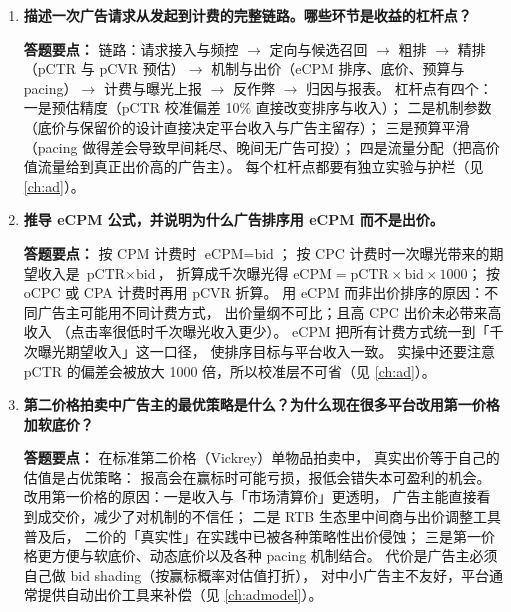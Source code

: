 \begin{interview}[题库与答题要点]

\begin{enumerate}[label=]

  \item[\textcolor{VioletDeep}{\textbf{Q59.}}] \textbf{描述一次广告请求从发起到计费的完整链路。哪些环节是收益的杠杆点？}
\par\smallskip\noindent\textcolor{VioletDeep}{\textbf{答题要点：}}
链路：请求接入与频控 $\to$ 定向与候选召回 $\to$ 粗排 $\to$
精排（pCTR 与 pCVR 预估）$\to$ 机制与出价（eCPM 排序、底价、预算与 pacing）$\to$
计费与曝光上报 $\to$ 反作弊 $\to$ 归因与报表。
杠杆点有四个：一是预估精度（pCTR 校准偏差 10\% 直接改变排序与收入）；
二是机制参数（底价与保留价的设计直接决定平台收入与广告主留存）；
三是预算平滑（pacing 做得差会导致早间耗尽、晚间无广告可投）；
四是流量分配（把高价值流量给到真正出价高的广告主）。
每个杠杆点都要有独立实验与护栏（见 \cref{ch:ad}）。

  \item[\textcolor{VioletDeep}{\textbf{Q60.}}] \textbf{推导 eCPM 公式，并说明为什么广告排序用 eCPM 而不是出价。}
\par\smallskip\noindent\textcolor{VioletDeep}{\textbf{答题要点：}}
按 CPM 计费时 $\text{eCPM} = \text{bid}$；
按 CPC 计费时一次曝光带来的期望收入是 $\text{pCTR}\times\text{bid}$，
折算成千次曝光得 $\text{eCPM} = \text{pCTR}\times\text{bid}\times 1000$；
按 oCPC 或 CPA 计费时再用 $\text{pCVR}$ 折算。
用 eCPM 而非出价排序的原因：不同广告主可能用不同计费方式，
出价量纲不可比；且高 CPC 出价未必带来高收入
（点击率很低时千次曝光收入更少）。
eCPM 把所有计费方式统一到「千次曝光期望收入」这一口径，
使排序目标与平台收入一致。
实操中还要注意 pCTR 的偏差会被放大 1000 倍，所以校准层不可省（见 \cref{ch:ad}）。

  \item[\textcolor{VioletDeep}{\textbf{Q61.}}] \textbf{第二价格拍卖中广告主的最优策略是什么？为什么现在很多平台改用第一价格加软底价？}
\par\smallskip\noindent\textcolor{VioletDeep}{\textbf{答题要点：}}
在标准第二价格（Vickrey）单物品拍卖中，
真实出价等于自己的估值是占优策略：
报高会在赢标时可能亏损，报低会错失本可盈利的机会。
改用第一价格的原因：一是收入与「市场清算价」更透明，
广告主能直接看到成交价，减少了对机制的不信任；
二是 RTB 生态里中间商与出价调整工具普及后，
二价的「真实性」在实践中已被各种策略性出价侵蚀；
三是第一价格更方便与软底价、动态底价以及各种 pacing 机制结合。
代价是广告主必须自己做 bid shading（按赢标概率对估值打折），
对中小广告主不友好，平台通常提供自动出价工具来补偿（见 \cref{ch:admodel}）。


\end{enumerate}
\end{interview}
